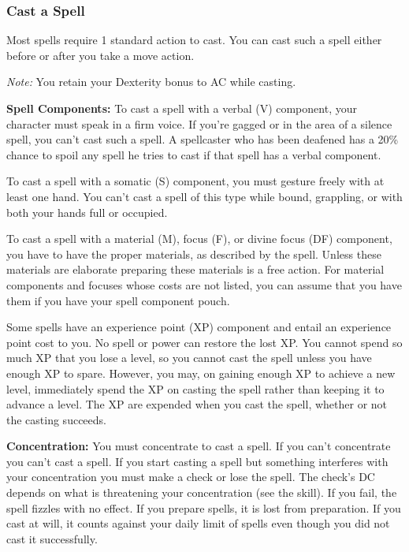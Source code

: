 \subsubsection{Cast a Spell}
Most spells require 1 standard action to cast. You can cast such a spell either before or after you take a move action.

\textit{Note:} You retain your Dexterity bonus to AC while casting.

\textbf{Spell Components:} To cast a spell with a verbal (V) component, your character must speak in a firm voice. If you're gagged or in the area of a silence spell, you can't cast such a spell. A spellcaster who has been deafened has a 20\% chance to spoil any spell he tries to cast if that spell has a verbal component.

To cast a spell with a somatic (S) component, you must gesture freely with at least one hand. You can't cast a spell of this type while bound, grappling, or with both your hands full or occupied.

To cast a spell with a material (M), focus (F), or divine focus (DF) component, you have to have the proper materials, as described by the spell. Unless these materials are elaborate preparing these materials is a free action. For material components and focuses whose costs are not listed, you can assume that you have them if you have your spell component pouch.

Some spells have an experience point (XP) component and entail an experience point cost to you. No spell or power can restore the lost XP. You cannot spend so much XP that you lose a level, so you cannot cast the spell unless you have enough XP to spare. However, you may, on gaining enough XP to achieve a new level, immediately spend the XP on casting the spell rather than keeping it to advance a level. The XP are expended when you cast the spell, whether or not the casting succeeds.

\textbf{Concentration:} You must concentrate to cast a spell. If you can't concentrate you can't cast a spell. If you start casting a spell but something interferes with your concentration you must make a  check or lose the spell. The check's DC depends on what is threatening your concentration (see the  skill). If you fail, the spell fizzles with no effect. If you prepare spells, it is lost from preparation. If you cast at will, it counts against your daily limit of spells even though you did not cast it successfully.


